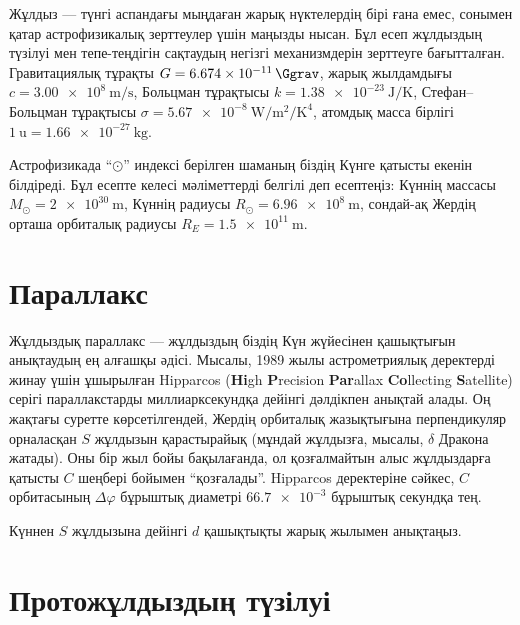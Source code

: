 

Жұлдыз --- түнгі аспандағы мыңдаған жарық нүктелердің бірі ғана емес, сонымен қатар астрофизикалық зерттеулер үшін маңызды нысан. Бұл есеп жұлдыздың түзілуі мен тепе-теңдігін сақтаудың негізгі механизмдерін зерттеуге бағытталған. Гравитациялық тұрақты $G=\qty{6.674e-11}{\Ggrav}$, жарық жылдамдығы $c=\qty{3.00e8}{\m\per\s}$, Больцман тұрақтысы $k=\qty{1.38e-23}{\J\per\K}$, Стефан--Больцман тұрақтысы $\sigma=\qty{5.67e-8}{\W\per\m\squared\per\K\tothe4}$, атомдық масса бірлігі $\qty{1}{\amu}=\qty{1.66e-27}{\kg}$.

Астрофизикада ``$\odot$'' индексі берілген шаманың біздің Күнге қатысты екенін білдіреді. Бұл есепте келесі мәліметтерді белгілі деп есептеңіз: Күннің массасы $M_\odot=\qty{2e30}{\m}$, Күннің радиусы $R_\odot=\qty{6.96e8}{\m}$, сондай-ақ Жердің орташа орбиталық радиусы $R_E=\qty{1.5e11}{\m}$.

\part{Параллакс}


Жұлдыздық параллакс --- жұлдыздың біздің Күн жүйесінен қашықтығын анықтаудың ең алғашқы әдісі. Мысалы, 1989 жылы астрометриялық деректерді жинау үшін ұшырылған Hipparcos (\textbf{Hi}gh \textbf{P}recision \textbf{Par}allax \textbf{Co}llecting \textbf{S}atellite) серігі параллакстарды миллиарксекундқа дейінгі дәлдікпен анықтай алады. Оң жақтағы суретте көрсетілгендей, Жердің орбиталық жазықтығына перпендикуляр орналасқан $S$ жұлдызын қарастырайық (мұндай жұлдызға, мысалы, $\delta$ Дракона жатады). Оны бір жыл бойы бақылағанда, ол қозғалмайтын алыс жұлдыздарға қатысты $C$ шеңбері бойымен ``қозғалады''. Hipparcos деректеріне сәйкес, $C$ орбитасының $\Delta\varphi$ бұрыштық диаметрі $\num{66.7e-3}$ бұрыштық секундқа тең.

\begin{task}
\item Күннен $S$ жұлдызына дейінгі $d$ қашықтықты жарық жылымен анықтаңыз.
\end{task}

\part{Протожұлдыздың түзілуі}

